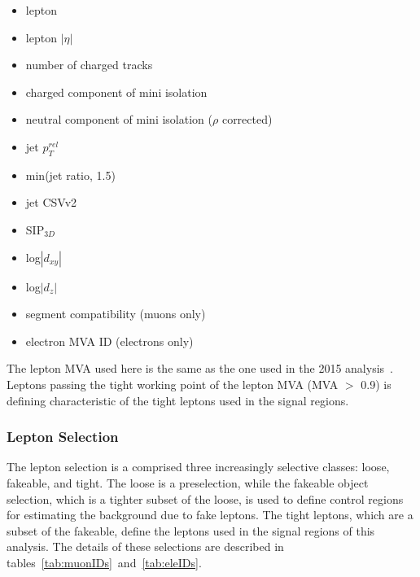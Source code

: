 \begin{itemize}
  \item lepton \pt
  \item lepton $|\eta|$
  \item number of charged tracks
  \item charged component of mini isolation
  \item neutral component of mini isolation ($\rho$ corrected)
  \item jet $p_{T}^{rel}$
  \item min(jet \pt ratio, 1.5)
  \item jet CSVv2
  \item SIP$_{3D}$
  \item log$|d_{xy}|$
  \item log$|d_{z}|$
  \item segment compatibility (muons only)
  \item electron MVA ID (electrons only)
\end{itemize}

The lepton MVA used here is the same as the one used in the 2015 \tth analysis~\cite{CMS-PAS-HIG-15-008}. Leptons passing the tight working point
of the lepton MVA (MVA $>$ 0.9) is defining characteristic of the tight leptons used in the signal regions. 

\subsubsection{Lepton Selection}
The lepton selection is a comprised three increasingly selective classes: loose, fakeable, and tight. The loose is a preselection, while the
fakeable object selection, which is a tighter subset of the loose, is used to define control regions for estimating the background due to fake leptons.
The tight leptons, which are a subset of the fakeable, define the leptons used in the signal regions of this analysis. The details of these selections are
described in tables~\ref{tab:muonIDs}~and~\ref{tab:eleIDs}.

